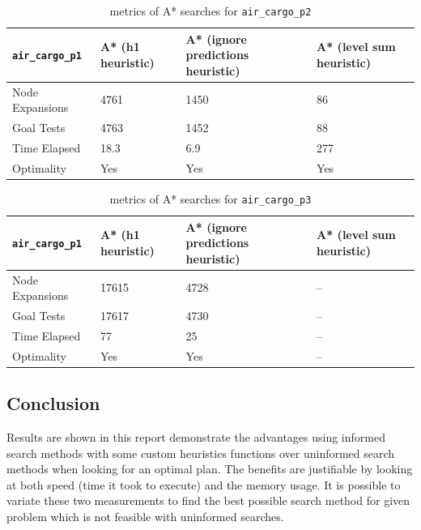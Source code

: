 \documentclass{article}
\begin{document}
\begin{table}[h]
\begin{center}
\begin{tabular}{|l|l|l|l|}
\hline
{\tt air\_cargo\_p1} & A* (h1 heuristic) & A* (ignore predictions heuristic) & A* (level sum heuristic)\\ \hline\hline
Node Expansions& 4761  & 1450  & 86 \\ 
Goal Tests & 4763 & 1452  & 88 \\ 
Time Elapsed& 18.3 & 6.9  & 277 \\ 
Optimality & Yes & Yes & Yes \\ \hline
\end{tabular}
\end{center}
\caption{metrics of A* searches for {\tt air\_cargo\_p2}}
\label{tbl:p2p2}
\end{table}

\begin{table}[h]
\begin{center}
\begin{tabular}{|l|l|l|l|}
\hline
{\tt air\_cargo\_p1} & A* (h1 heuristic) & A* (ignore predictions heuristic) & A* (level sum heuristic)\\ \hline\hline
Node Expansions& 17615  &  4728 & -- \\ 
Goal Tests &17617  &  4730 & -- \\ 
Time Elapsed& 77 & 25  & -- \\ 
Optimality & Yes & Yes & -- \\ \hline
\end{tabular}
\end{center}
\caption{metrics of A* searches for {\tt air\_cargo\_p3}}
\label{tbl:p2p3}
\end{table}


\subsection*{Conclusion}
Results are shown in this report demonstrate the advantages using informed search methods with some custom heuristics functions over uninformed search methods when looking for an optimal plan. The benefits are justifiable by looking at both speed (time it took to execute) and the memory usage. It is possible to variate these two measurements to find the best possible search method for given problem which is not feasible with uninformed searches. 
\end{document}
